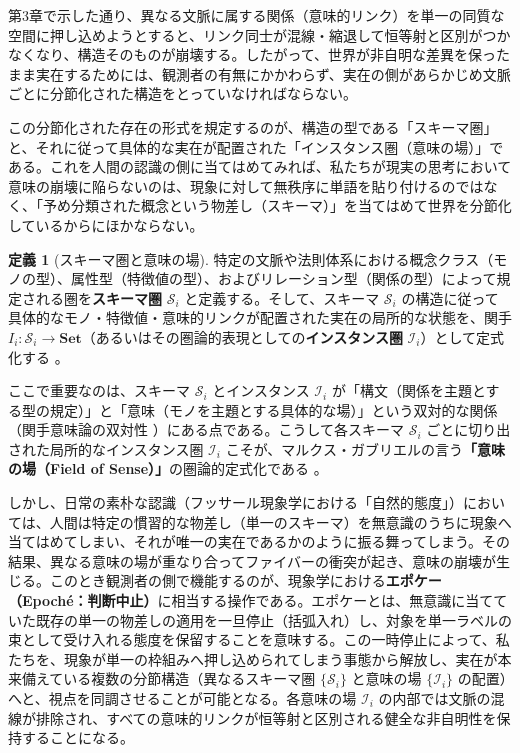 \documentclass[11pt,a4paper,luatex]{jlreq}
\theoremstyle{definition}
\newtheorem{definition}{定義}[section]
\theoremstyle{plain}
\begin{document}
第3章で示した通り、異なる文脈に属する関係（意味的リンク）を単一の同質な空間に押し込めようとすると、リンク同士が混線・縮退して恒等射と区別がつかなくなり、構造そのものが崩壊する。したがって、世界が非自明な差異を保ったまま実在するためには、観測者の有無にかかわらず、実在の側があらかじめ文脈ごとに分節化された構造をとっていなければならない。

この分節化された存在の形式を規定するのが、構造の型である「スキーマ圏」と、それに従って具体的な実在が配置された「インスタンス圏（意味の場）」である。これを人間の認識の側に当てはめてみれば、私たちが現実の思考において意味の崩壊に陥らないのは、現象に対して無秩序に単語を貼り付けるのではなく、「予め分類された概念という物差し（スキーマ）」を当てはめて世界を分節化しているからにほかならない。

\begin{definition}[スキーマ圏と意味の場]
特定の文脈や法則体系における概念クラス（モノの型）、属性型（特徴値の型）、およびリレーション型（関係の型）によって規定される圏を\textbf{スキーマ圏} $\mathcal{S}_{i}$ と定義する。そして、スキーマ $\mathcal{S}_{i}$ の構造に従って具体的なモノ・特徴値・意味的リンクが配置された実在の局所的な状態を、関手 $I_i: \mathcal{S}_i \to \mathbf{Set}$（あるいはその圏論的表現としての\textbf{インスタンス圏} $\mathcal{I}_{i}$）として定式化する \cite{lawvere1963,spivak2012}。
\end{definition}

ここで重要なのは、スキーマ $\mathcal{S}_{i}$ とインスタンス $\mathcal{I}_{i}$ が「構文（関係を主題とする型の規定）」と「意味（モノを主題とする具体的な場）」という双対的な関係（関手意味論の双対性 \cite{lawvere1963}）にある点である。こうして各スキーマ $\mathcal{S}_{i}$ ごとに切り出された局所的なインスタンス圏 $\mathcal{I}_{i}$ こそが、マルクス・ガブリエルの言う\textbf{「意味の場（Field of Sense）」}の圏論的定式化である \cite{gabriel2015}。

しかし、日常の素朴な認識（フッサール現象学における「自然的態度」\cite{husserl1913}）においては、人間は特定の慣習的な物差し（単一のスキーマ）を無意識のうちに現象へ当てはめてしまい、それが唯一の実在であるかのように振る舞ってしまう。その結果、異なる意味の場が重なり合ってファイバーの衝突が起き、意味の崩壊が生じる。このとき観測者の側で機能するのが、現象学における\textbf{エポケー（Epoch\'e：判断中止）}に相当する操作である。エポケーとは、無意識に当てていた既存の単一の物差しの適用を一旦停止（括弧入れ）し、対象を単一ラベルの束として受け入れる態度を保留することを意味する。この一時停止によって、私たちを、現象が単一の枠組みへ押し込められてしまう事態から解放し、実在が本来備えている複数の分節構造（異なるスキーマ圏 $\{\mathcal{S}_i\}$ と意味の場 $\{\mathcal{I}_i\}$ の配置）へと、視点を同調させることが可能となる。各意味の場 $\mathcal{I}_{i}$ の内部では文脈の混線が排除され、すべての意味的リンクが恒等射と区別される健全な非自明性を保持することになる。
\end{document}
